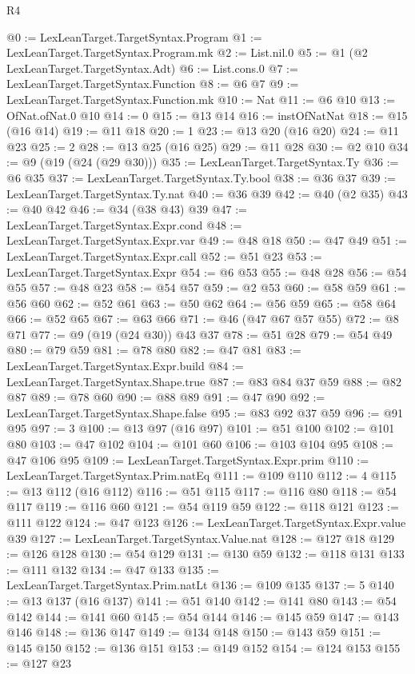 \begin{lexlean}{R4}
\begin{coremodule}
@0 := LexLeanTarget.TargetSyntax.Program
@1 := LexLeanTarget.TargetSyntax.Program.mk
@2 := List.nil.{0}
@5 := @1 (@2 LexLeanTarget.TargetSyntax.Adt)
@6 := List.cons.{0}
@7 := LexLeanTarget.TargetSyntax.Function
@8 := @6 @7
@9 := LexLeanTarget.TargetSyntax.Function.mk
@10 := Nat
@11 := @6 @10
@13 := OfNat.ofNat.{0} @10
@14 := 0
@15 := @13 @14
@16 := instOfNatNat
@18 := @15 (@16 @14)
@19 := @11 @18
@20 := 1
@23 := @13 @20 (@16 @20)
@24 := @11 @23
@25 := 2
@28 := @13 @25 (@16 @25)
@29 := @11 @28
@30 := @2 @10
@34 := @9 (@19 (@24 (@29 @30)))
@35 := LexLeanTarget.TargetSyntax.Ty
@36 := @6 @35
@37 := LexLeanTarget.TargetSyntax.Ty.bool
@38 := @36 @37
@39 := LexLeanTarget.TargetSyntax.Ty.nat
@40 := @36 @39
@42 := @40 (@2 @35)
@43 := @40 @42
@46 := @34 (@38 @43) @39
@47 := LexLeanTarget.TargetSyntax.Expr.cond
@48 := LexLeanTarget.TargetSyntax.Expr.var
@49 := @48 @18
@50 := @47 @49
@51 := LexLeanTarget.TargetSyntax.Expr.call
@52 := @51 @23
@53 := LexLeanTarget.TargetSyntax.Expr
@54 := @6 @53
@55 := @48 @28
@56 := @54 @55
@57 := @48 @23
@58 := @54 @57
@59 := @2 @53
@60 := @58 @59
@61 := @56 @60
@62 := @52 @61
@63 := @50 @62
@64 := @56 @59
@65 := @58 @64
@66 := @52 @65
@67 := @63 @66
@71 := @46 (@47 @67 @57 @55)
@72 := @8 @71
@77 := @9 (@19 (@24 @30)) @43 @37
@78 := @51 @28
@79 := @54 @49
@80 := @79 @59
@81 := @78 @80
@82 := @47 @81
@83 := LexLeanTarget.TargetSyntax.Expr.build
@84 := LexLeanTarget.TargetSyntax.Shape.true
@87 := @83 @84 @37 @59
@88 := @82 @87
@89 := @78 @60
@90 := @88 @89
@91 := @47 @90
@92 := LexLeanTarget.TargetSyntax.Shape.false
@95 := @83 @92 @37 @59
@96 := @91 @95
@97 := 3
@100 := @13 @97 (@16 @97)
@101 := @51 @100
@102 := @101 @80
@103 := @47 @102
@104 := @101 @60
@106 := @103 @104 @95
@108 := @47 @106 @95
@109 := LexLeanTarget.TargetSyntax.Expr.prim
@110 := LexLeanTarget.TargetSyntax.Prim.natEq
@111 := @109 @110
@112 := 4
@115 := @13 @112 (@16 @112)
@116 := @51 @115
@117 := @116 @80
@118 := @54 @117
@119 := @116 @60
@121 := @54 @119 @59
@122 := @118 @121
@123 := @111 @122
@124 := @47 @123
@126 := LexLeanTarget.TargetSyntax.Expr.value @39
@127 := LexLeanTarget.TargetSyntax.Value.nat
@128 := @127 @18
@129 := @126 @128
@130 := @54 @129
@131 := @130 @59
@132 := @118 @131
@133 := @111 @132
@134 := @47 @133
@135 := LexLeanTarget.TargetSyntax.Prim.natLt
@136 := @109 @135
@137 := 5
@140 := @13 @137 (@16 @137)
@141 := @51 @140
@142 := @141 @80
@143 := @54 @142
@144 := @141 @60
@145 := @54 @144
@146 := @145 @59
@147 := @143 @146
@148 := @136 @147
@149 := @134 @148
@150 := @143 @59
@151 := @145 @150
@152 := @136 @151
@153 := @149 @152
@154 := @124 @153
@155 := @127 @23

\end{coremodule}
\end{lexlean}
